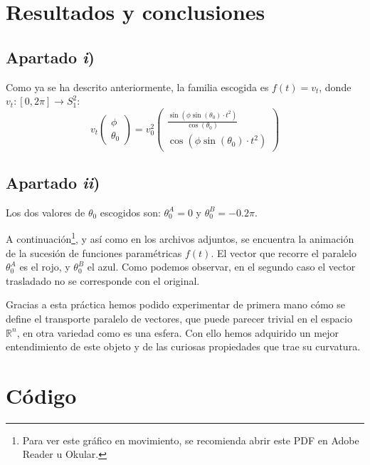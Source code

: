 \documentclass[a4paper]{article}
\begin{document}
	\section{Resultados y conclusiones}
	
	\subsection{Apartado \textit{i})}
	
	Como ya se ha descrito anteriormente, la familia escogida es $f(t)=v_t$, donde $v_t : [0,2\pi] \to S_1^2$:	
	\[v_t\left(\begin{array}{cc}\phi\\\theta_0\end{array}\right) 
	= v^2_0 \left(\begin{array}{cc}
	\frac{\sin(\phi\sin(\theta_0)\cdot t^2)}{\cos(\theta_0)}\\
	\cos(\phi\sin(\theta_0)\cdot t^2)
	\end{array}\right)\]
	
	\subsection{Apartado \textit{ii})}
	Los dos valores de $\theta_0$ escogidos son: $\theta_0^A=0$ y $\theta_0^B=-0.2\pi$. 
	
	A continuación\footnote{Para ver este gráfico en movimiento, se recomienda abrir este PDF en Adobe Reader u Okular.}, y así como en los archivos adjuntos, se encuentra la animación de la sucesión de funciones paramétricas $f(t)$. El vector que recorre el paralelo $\theta_0^A$ es el rojo, y $\theta_0^B$ el azul. Como podemos observar, en el segundo caso el vector trasladado no se corresponde con el original.
	
	\begin{center}
	\end{center}
	
	Gracias a esta práctica hemos podido experimentar de primera mano cómo se define el transporte paralelo de vectores, que puede parecer trivial en el espacio $\mathbb{R}^n$, en otra variedad como es una esfera. Con ello hemos adquirido un mejor entendimiento de este objeto y de las curiosas propiedades que trae su curvatura.
	
	\newpage
	\section{Código}\label{codigo}
	
	
	
\end{document}
